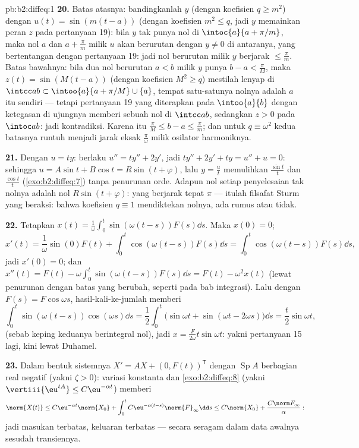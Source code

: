 \begin{solution}{pb:b2:diffeq:1}
\textbf{20.} Batas atasnya: bandingkanlah $y$ (dengan koefisien $q \geq
m^2$) dengan $u(t) = \sin(m(t - a))$ (dengan koefisien $m^2 \leq q$,
jadi $y$ memainkan peran $z$ pada pertanyaan 19): bila $y$ tak punya
nol di $\intoc{a}{a + \pi/m}$, maka nol $a$ dan $a +
\frac\pi m$ milik $u$ akan berurutan dengan $y \neq 0$
di antaranya, yang bertentangan dengan pertanyaan 19: jadi nol berurutan
milik $y$ berjarak $\leq \frac\pi m$. Batas bawahnya: bila dua
nol berurutan $a < b$ milik $y$ punya $b - a < \frac\pi M$,
maka $z(t) = \sin(M(t-a))$ (dengan koefisien $M^2 \geq q$) mestilah
lenyap di $\intcc ab \subset \intoo{a}{a + \pi/M}
\cup\{a\}$, tempat satu-satunya nolnya adalah $a$ itu sendiri --- tetapi
pertanyaan 19 yang diterapkan pada $\intoo{a}{b}$ dengan ketegasan di
ujungnya memberi sebuah nol di $\intcc ab$, sedangkan $z > 0$ pada
$\intoc ab$: jadi kontradiksi. Karena itu $\frac\pi M \leq b - a \leq
\frac\pi m$; dan untuk $q \equiv \omega^2$ kedua batasnya runtuh menjadi
jarak eksak $\frac\pi\omega$ milik osilator
harmoniknya.

\textbf{21.} Dengan $u = ty$: berlaku $u'' = ty'' + 2y'$, jadi $ty'' + 2y'
+ ty = u'' + u = 0$: sehingga $u = A\sin t + B\cos t = R\sin(t +
\varphi)$, lalu $y = \frac{u}{t}$ memulihkan $\frac{\sin t}t$ dan
$\frac{\cos t}t$ (\cref{exo:b2:diffeq:7}) tanpa penurunan
orde. Adapun nol setiap penyelesaian tak nolnya adalah nol
$R\sin(t + \varphi)$: yang berjarak tepat $\pi$ --- itulah
filsafat Sturm yang beraksi: bahwa koefisien $q \equiv 1$ mendiktekan
nolnya, ada rumus atau tidak.

\textbf{22.} Tetapkan $x(t) =
\frac1\omega\int_0^t\sin(\omega(t-s))F(s)\dd s$. Maka $x(0) =
0$;
\[
x'(t) = \frac1\omega\sin(0)F(t) +
\int_0^t\cos(\omega(t-s))F(s)\dd s
= \int_0^t\cos(\omega(t-s))F(s)\dd s ,
\]
jadi $x'(0) = 0$; dan $x''(t) = F(t) -
\omega\int_0^t\sin(\omega(t-s))F(s)\dd s = F(t) - \omega^2x(t)$
(lewat penurunan  dengan batas yang berubah,
seperti pada bab integrasi). Lalu dengan $F(s) = F\cos\omega s$,
hasil-kali-ke-jumlah memberi
\[
\int_0^t\sin(\omega(t-s))\cos(\omega s)\dd s
= \frac12\int_0^t\bigl(\sin\omega t + \sin(\omega t -
2\omega s)\bigr)\dd s
= \frac{t}{2}\sin\omega t ,
\]
(sebab keping keduanya berintegral nol), jadi $x =
\frac{F}{2\omega}t\sin\omega t$: yakni pertanyaan 15 lagi, kini lewat
Duhamel.

\textbf{23.} Dalam bentuk sistemnya $X' = AX + (0, F(t))^{\mathsf T}$
dengan $\operatorname{Sp}A$ berbagian real negatif (yakni $\zeta >
0$): variasi konstanta dan \cref{exo:b2:diffeq:8}
(yakni $\vertiii{\eu^{tA}} \leq C\eu^{-\alpha t}$) memberi
\[
\norm{X(t)} \leq C\eu^{-\alpha t}\norm{X_0}
+ \int_0^t C\eu^{-\alpha(t-s)}\norm{F}_\infty\dd s
\leq C\norm{X_0} + \frac{C\norm F_\infty}{\alpha} :
\]
jadi masukan terbatas, keluaran terbatas --- secara seragam dalam data
awalnya sesudah transiennya.


\end{solution}

